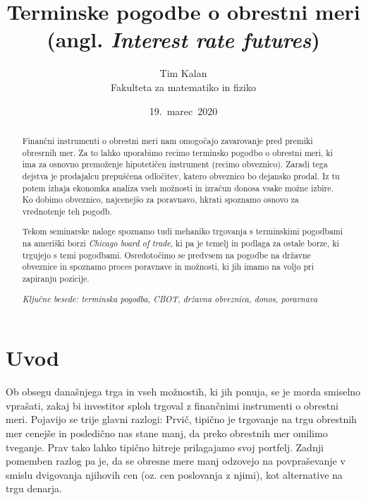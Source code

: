 \documentclass[a4paper, 11pt]{article}
\author{Tim Kalan \\ Fakulteta za matematiko in fiziko}
\title{
    Terminske pogodbe o obrestni meri \\ 
    \large (angl. \textit{Interest rate futures})}
\date{19.\ marec\ 2020} %
\begin{document}
\begin{titlepage}
    \maketitle
    \thispagestyle{empty}
\end{titlepage}

\pagebreak

\begin{abstract}
    Finančni instrumenti o obrestni meri nam omogočajo zavarovanje pred premiki obresrnih mer. Za to 
    lahko uporabimo recimo terminsko pogodbo o obrestni meri, ki ima za osnovno premoženje hipotetičen
    instrument (recimo obveznico). Zaradi tega dejstva je prodajalcu prepuščena odločitev, katero 
    obveznico bo dejansko prodal. Iz tu potem izhaja ekonomka analiza vseh možnosti in izračun donosa
    vsake možne izbire. Ko dobimo obveznico, najcenejšo za poravnavo, hkrati spoznamo osnovo za vrednotenje
    teh pogodb. 

    Tekom seminarske naloge spoznamo tudi mehaniko trgovanja s terminskimi pogodbami na ameriški borzi 
    \textit{Chicago board of trade}, ki pa je temelj in podlaga za ostale borze, ki trgujejo s temi pogodbami. 
    Osredotočimo se predvsem na pogodbe na državne obveznice in spoznamo proces poravnave in možnosti, ki jih 
    imamo na voljo pri zapiranju pozicije.

    \textit{Ključne besede: terminska pogodba, CBOT, državna obveznica, donos, poravnava}
    

\end{abstract}

\pagebreak

\tableofcontents

\pagebreak

\section{Uvod}
Ob obsegu današnjega trga in vseh možnostih, ki jih ponuja, se je morda smiselno vprašati,
zakaj bi investitor sploh trgoval z finančnimi instrumenti o obrestni meri. Pojavijo se trije
glavni razlogi: Prvič, tipično je trgovanje na trgu obrestnih mer cenejše in posledično nas 
stane manj, da preko obrestnih mer omilimo tveganje. Prav tako lahko tipično hitreje prilagajamo svoj 
portfelj. Zadnji pomemben razlog pa je, da se obresne mere manj odzovejo na povpraševanje v 
smislu dvigovanja njihovih cen (oz. cen poslovanja z njimi), kot alternative na trgu denarja.
\end{document}
